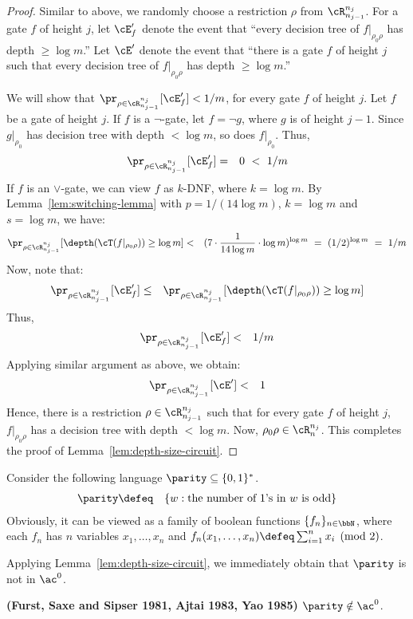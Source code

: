 \documentclass[11pt, a4paper]{article}
\begin{document}
\begin{proof}
Similar to above,
we randomly choose a restriction $\rho$ from $\cR^{n_j}_{n_{j-1}}$. 
For a gate $f$ of height $j$,
let $\cE_f'$ denote the event that ``every decision tree of $f|_{\rho_0\rho}$ has depth $\geq \log m$.''
Let $\cE'$ denote the event that ``there is a gate $f$ of height $j$ such that every decision tree of $f|_{\rho_0\rho}$ has depth $\geq \log m$.''

We will show that $\pr_{\rho\in \cR^{n_j}_{n_{j-1}}} [\cE_f'] < 1/m$, for every gate $f$ of height $j$.
Let $f$ be a gate of height $j$.
If $f$ is a $\neg$-gate, let $f= \neg g$, where $g$ is of height $j-1$.
Since $g|_{\rho_0}$ has decision tree with depth $<\log m$, so does $f|_{\rho_0}$.
Thus,
\begin{eqnarray*}
\pr_{\rho\in \cR^{n_j}_{n_{j-1}}}[\cE_f'] & = & 0 \ < \ 1/m
\end{eqnarray*}
If $f$ is an $\vee$-gate, we can view $f$ as $k$-DNF, where $k=\log m$.
By Lemma~\ref{lem:switching-lemma} with $p=1/(14\log m)$, $k=\log m$ and $s=\log m$,
we have:
\begin{eqnarray*}
\pr_{\rho\in \cR^{n_j}_{n_{j-1}}}[\depth(\cT(f|_{\rho_0\rho}))\geq \log m] & < &  (7 \cdot \frac{1}{14 \log m} \cdot \log m)^{\log m}
\ = \ (1/2)^{\log m} \ = \ 1/m 
\end{eqnarray*}
Now, note that: 
\begin{eqnarray*}
\pr_{\rho\in \cR^{n_j}_{n_{j-1}}} [\cE_f'] & \leq & \pr_{\rho\in \cR^{n_j}_{n_{j-1}}}[\depth(\cT(f|_{\rho_0\rho}))\geq \log m] 
\end{eqnarray*}
Thus, 
\begin{eqnarray*}
\pr_{\rho\in \cR^{n_j}_{n_{j-1}}} [\cE_f'] & < & 1/m
\end{eqnarray*}
Applying similar argument as above, we obtain:
\begin{eqnarray*}
\pr_{\rho\in \cR^{n_j}_{n_{j-1}}}[\cE'] & < & 1
\end{eqnarray*}
Hence, there is a restriction $\rho \in  \cR^{n_j}_{n_{j-1}}$ such that 
for every gate $f$ of height $j$, $f|_{\rho_0\rho}$ has a decision tree with depth $< \log m$.
Now, $\rho_0\rho \in \cR^{n_j}_n$.
This completes the proof of Lemma~\ref{lem:depth-size-circuit}.
\end{proof}


Consider the following language $\parity \subseteq \{0,1\}^*$.
\begin{eqnarray*}
\parity & \defeq & \{w: \text{the number of 1's in}\ w \ \text{is odd}\}
\end{eqnarray*}
Obviously, it can be viewed as a family of boolean functions $\{f_n\}_{n\in\bbN}$,
where each $f_n$ has $n$ variables $x_1,\ldots,x_n$ and $f_n(x_1,\ldots,x_n) \defeq \sum_{i=1}^n x_i \pmod 2$.


Applying Lemma~\ref{lem:depth-size-circuit}, we immediately obtain that $\parity$ is not in $\ac^0$.

\begin{theorem}
\label{theo:parity}
{\bf (Furst, Saxe and Sipser 1981, Ajtai 1983, Yao 1985)}
$\parity \notin \ac^0$.
\end{theorem}
\end{document}
